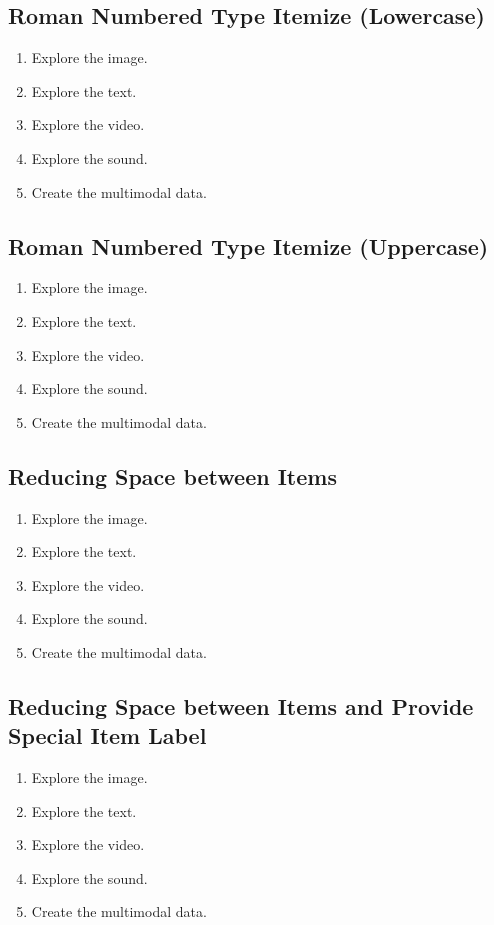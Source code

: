 \documentclass[11pt]{article}
\begin{document}
\subsection{Roman Numbered Type Itemize (Lowercase)}
\begin{enumerate}[i]
\item Explore the image.
\item Explore the text.
\item Explore the video.
\item Explore the sound.
\item Create the multimodal data.
\end{enumerate}

\subsection{Roman Numbered Type Itemize (Uppercase)}
\begin{enumerate}[I]
\item Explore the image.
\item Explore the text.
\item Explore the video.
\item Explore the sound.
\item Create the multimodal data.
\end{enumerate}

\subsection{Reducing Space between Items}
\begin{enumerate}[nosep]
\item Explore the image.
\item Explore the text.
\item Explore the video.
\item Explore the sound.
\item Create the multimodal data.
\end{enumerate}

\subsection{Reducing Space between Items and Provide Special Item Label}
\begin{enumerate}[nosep, label=*]
\item Explore the image.
\item Explore the text.
\item Explore the video.
\item Explore the sound.
\item Create the multimodal data.
\end{enumerate}
\end{document}
